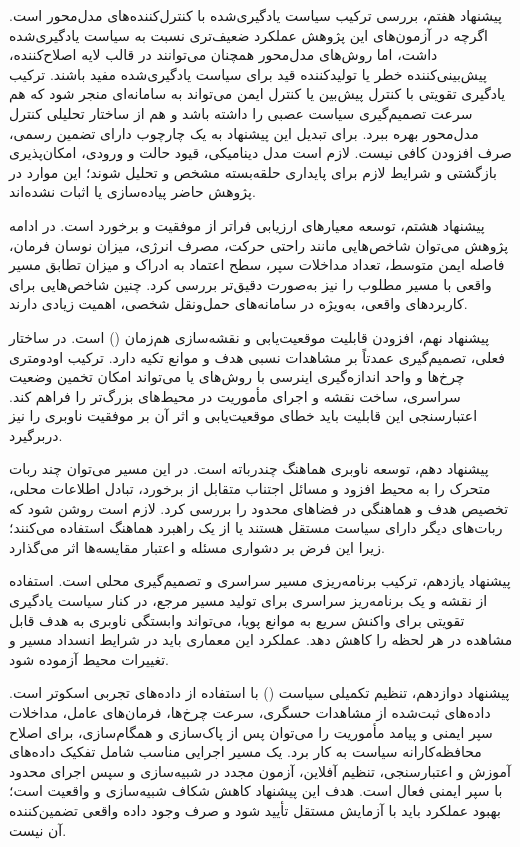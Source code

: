 پیشنهاد هفتم، بررسی ترکیب سیاست یادگیری‌شده با کنترل‌کننده‌های مدل‌محور است. اگرچه  در آزمون‌های این پژوهش عملکرد ضعیف‌تری نسبت به سیاست یادگیری‌شده داشت، اما روش‌های مدل‌محور همچنان می‌توانند در قالب لایه اصلاح‌کننده، پیش‌بینی‌کننده خطر یا تولیدکننده قید برای سیاست یادگیری‌شده مفید باشند. ترکیب یادگیری تقویتی با کنترل پیش‌بین یا کنترل ایمن می‌تواند به سامانه‌ای منجر شود که هم سرعت تصمیم‌گیری سیاست عصبی را داشته باشد و هم از ساختار تحلیلی کنترل مدل‌محور بهره ببرد.
برای تبدیل این پیشنهاد به یک چارچوب دارای تضمین رسمی، صرف افزودن  کافی نیست. لازم است مدل دینامیکی، قیود حالت و ورودی، امکان‌پذیری بازگشتی و شرایط لازم برای پایداری حلقه‌بسته مشخص و تحلیل شوند؛ این موارد در پژوهش حاضر پیاده‌سازی یا اثبات نشده‌اند.


پیشنهاد هشتم، توسعه معیارهای ارزیابی فراتر از موفقیت و برخورد است. در ادامه پژوهش می‌توان شاخص‌هایی مانند راحتی حرکت، مصرف انرژی، میزان نوسان فرمان، فاصله ایمن متوسط، تعداد مداخلات سپر، سطح اعتماد به ادراک و میزان تطابق مسیر واقعی با مسیر مطلوب را نیز به‌صورت دقیق‌تر بررسی کرد. چنین شاخص‌هایی برای کاربردهای واقعی، به‌ویژه در سامانه‌های حمل‌ونقل شخصی، اهمیت زیادی دارند.

پیشنهاد نهم، افزودن قابلیت موقعیت‌یابی و نقشه‌سازی هم‌زمان () است. در ساختار فعلی، تصمیم‌گیری عمدتاً بر مشاهدات نسبی هدف و موانع تکیه دارد. ترکیب اودومتری چرخ‌ها و واحد اندازه‌گیری اینرسی با روش‌های  یا  می‌تواند امکان تخمین وضعیت سراسری، ساخت نقشه و اجرای مأموریت در محیط‌های بزرگ‌تر را فراهم کند. اعتبارسنجی این قابلیت باید خطای موقعیت‌یابی و اثر آن بر موفقیت ناوبری را نیز دربرگیرد.

پیشنهاد دهم، توسعه ناوبری هماهنگ چندرباته است. در این مسیر می‌توان چند ربات متحرک را به محیط افزود و مسائل اجتناب متقابل از برخورد، تبادل اطلاعات محلی، تخصیص هدف و هماهنگی در فضاهای محدود را بررسی کرد. لازم است روشن شود که ربات‌های دیگر دارای سیاست مستقل هستند یا از یک راهبرد هماهنگ استفاده می‌کنند؛ زیرا این فرض بر دشواری مسئله و اعتبار مقایسه‌ها اثر می‌گذارد.

پیشنهاد یازدهم، ترکیب برنامه‌ریزی مسیر سراسری و تصمیم‌گیری محلی است. استفاده از نقشه و یک برنامه‌ریز سراسری برای تولید مسیر مرجع، در کنار سیاست یادگیری تقویتی برای واکنش سریع به موانع پویا، می‌تواند وابستگی ناوبری به هدف قابل مشاهده در هر لحظه را کاهش دهد. عملکرد این معماری باید در شرایط انسداد مسیر و تغییرات محیط آزموده شود.

پیشنهاد دوازدهم، تنظیم تکمیلی سیاست () با استفاده از داده‌های تجربی اسکوتر است. داده‌های ثبت‌شده از مشاهدات حسگری، سرعت چرخ‌ها، فرمان‌های عامل، مداخلات سپر ایمنی و پیامد مأموریت را می‌توان پس از پاک‌سازی و همگام‌سازی، برای اصلاح محافظه‌کارانه سیاست به کار برد. یک مسیر اجرایی مناسب شامل تفکیک داده‌های آموزش و اعتبارسنجی، تنظیم آفلاین، آزمون مجدد در شبیه‌سازی و سپس اجرای محدود با سپر ایمنی فعال است. هدف این پیشنهاد کاهش شکاف شبیه‌سازی و واقعیت است؛ بهبود عملکرد باید با آزمایش مستقل تأیید شود و صرف وجود داده واقعی تضمین‌کننده آن نیست.

